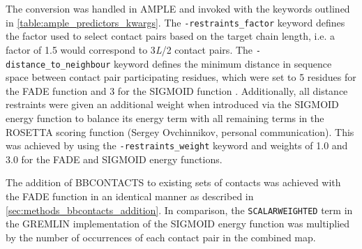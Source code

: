 The conversion was handled in AMPLE and invoked with the keywords outlined in \cref{table:ample_predictors_kwargs}. The \texttt{-restraints\_factor} keyword defines the factor used to select contact pairs based on the target chain length, i.e. a factor of 1.5 would correspond to 3\textit{L}/2 contact pairs. The \texttt{-distance\_to\_neighbour} keyword defines the minimum distance in sequence space between contact pair participating residues, which were set to 5 residues for the FADE function \cite{Michel2014-eg} and 3 for the SIGMOID function \cite{Ovchinnikov2015-tn}. Additionally, all distance restraints were given an additional weight when introduced via the SIGMOID energy function to balance its energy term with all remaining terms in the ROSETTA scoring function (Sergey Ovchinnikov, personal communication). This was achieved by using the \texttt{-restraints\_weight} keyword and weights of 1.0 and 3.0 for the FADE and SIGMOID energy functions.

The addition of BBCONTACTS to existing sets of contacts was achieved with the FADE function in an identical manner as described in \cref{sec:methods_bbcontacts_addition}. In comparison, the \texttt{SCALARWEIGHTED} term in the GREMLIN implementation of the SIGMOID energy function \cite{Ovchinnikov2015-tn} was multiplied by the number of occurrences of each contact pair in the combined map.

